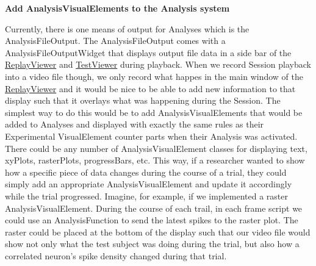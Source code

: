 {\bfseries Add Analysis\-Visual\-Elements to the Analysis system}\par
 Currently, there is one means of output for Analyses which is the Analysis\-File\-Output. The Analysis\-File\-Output comes with a Analysis\-File\-Output\-Widget that displays output file data in a side bar of the \hyperlink{class_replay_viewer}{Replay\-Viewer} and \hyperlink{class_test_viewer}{Test\-Viewer} during playback. When we record Session playback into a video file though, we only record what happes in the main window of the \hyperlink{class_replay_viewer}{Replay\-Viewer} and it would be nice to be able to add new information to that display such that it overlays what was happening during the Session. The simplest way to do this would be to add Analysis\-Visual\-Elements that would be added to Analyses and displayed with exactly the same rules as their Experimental Visual\-Element counter parts when their Analysis was activated. There could be any number of Analysis\-Visual\-Element classes for displaying text, xy\-Plots, raster\-Plots, progress\-Bars, etc. This way, if a researcher wanted to show how a specific piece of data changes during the course of a trial, they could simply add an appropriate Analysis\-Visual\-Element and update it accordingly while the trial progressed. Imagine, for example, if we implemented a raster Analysis\-Visual\-Element. During the course of each trail, in each frame script we could use an Analysis\-Function to send the latest spikes to the raster plot. The raster could be placed at the bottom of the display such that our video file would show not only what the test subject was doing during the trial, but also how a correlated neuron's spike density changed during that trial.

